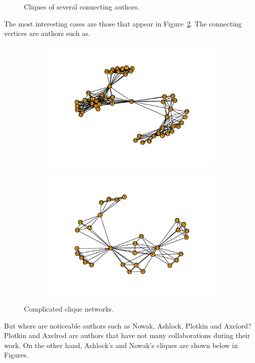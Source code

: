 \documentclass{article}
\begin{document}
\begin{figure}[!hbtp]
\begin{subfigure}{0.35\textwidth}
    \end{subfigure}
\caption{Cliques of several connecting authors.}\label{fig:cliques_1}
\end{figure} %

The most interesting cases are those that appear in Figure~\ref{fig:cliques_2}.
The connecting vertices are authors such as.

\begin{figure}[!hbtp]
    \begin{subfigure}{0.5\textwidth}
        \includegraphics[width=\textwidth]{./assets/images/coauthor05.pdf}
    \end{subfigure}
    \begin{subfigure}{0.5\textwidth}
        \includegraphics[width=\textwidth]{./assets/images/coauthor08.pdf}
    \end{subfigure}
\caption{Complicated clique networks.}\label{fig:cliques_2}
\end{figure} %


But where are noticeable authors such as Nowak, Ashlock, Plotkin and Axelord? 
Plotkin and Axelrod are authors that have not many collaborations during their
work. On the other hand, Ashlock's and Nowak's cliques are shown below in
Figures.



\end{document}
